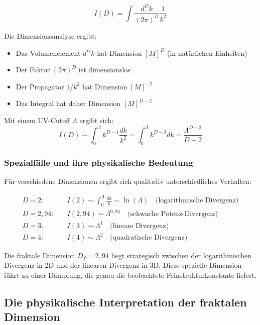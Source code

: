\documentclass[12pt,a4paper]{article}
\theoremstyle{definition}
\begin{document}
	\begin{equation}
		I(D) = \int \frac{d^D k}{(2\pi)^D} \frac{1}{k^2}
	\end{equation}
	
	Die Dimensionsanalyse ergibt:
	\begin{itemize}
		\item Das Volumenelement $d^D k$ hat Dimension $[M]^D$ (in natürlichen Einheiten)
		\item Der Faktor $(2\pi)^D$ ist dimensionslos
		\item Der Propagator $1/k^2$ hat Dimension $[M]^{-2}$
		\item Das Integral hat daher Dimension $[M]^{D-2}$
	\end{itemize}
	
	Mit einem UV-Cutoff $\Lambda$ ergibt sich:
	\begin{equation}
		I(D) \sim \int_0^{\Lambda} k^{D-1} \frac{dk}{k^2} = \int_0^{\Lambda} k^{D-3} dk = \frac{\Lambda^{D-2}}{D-2}
	\end{equation}
	
	\subsubsection{Spezialfälle und ihre physikalische Bedeutung}
	
	Für verschiedene Dimensionen ergibt sich qualitativ unterschiedliches Verhalten:
	
	\begin{align}
		D = 2: \quad &I(2) \sim \int_0^{\Lambda} \frac{dk}{k} = \ln(\Lambda) \quad \text{(logarithmische Divergenz)}\\
		D = 2{,}94: \quad &I(2{,}94) \sim \Lambda^{0{,}94} \quad \text{(schwache Potenz-Divergenz)}\\
		D = 3: \quad &I(3) \sim \Lambda^{1} \quad \text{(lineare Divergenz)}\\
		D = 4: \quad &I(4) \sim \Lambda^{2} \quad \text{(quadratische Divergenz)}
	\end{align}
	
	Die fraktale Dimension $D_f = 2{,}94$ liegt strategisch zwischen der logarithmischen Divergenz in 2D und der linearen Divergenz in 3D. Diese spezielle Dimension führt zu einer Dämpfung, die genau die beobachtete Feinstrukturkonstante liefert.
	
	\subsection{Die physikalische Interpretation der fraktalen Dimension}
	
\end{document}
